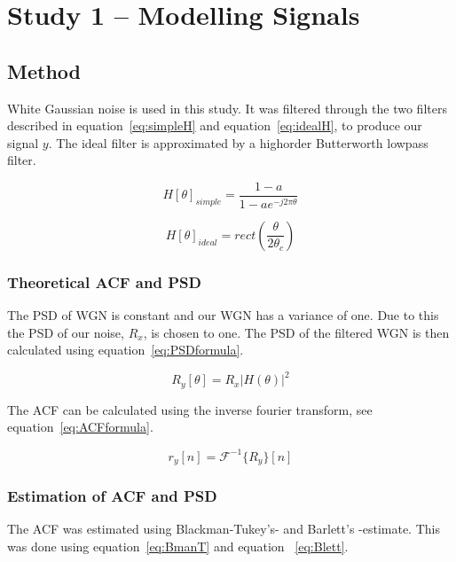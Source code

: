 \documentclass[10pt]{article}
\begin{document}
\section{Study 1 – Modelling Signals}
\subsection{Method}

White Gaussian noise is used in this study. It was filtered through the two
 filters described in equation~\ref{eq:simpleH} and equation~\ref{eq:idealH},
  to produce our signal $y$.
 The ideal filter is approximated by a highorder Butterworth lowpass filter.

\begin{equation}
  \label{eq:simpleH}
  H[\theta]_{simple} =\frac{1-a}{1-ae^{-j2\pi\theta }}
\end{equation}

\begin{equation}
  \label{eq:idealH}
  H[\theta]_{ideal} =rect(\frac{\theta}{2\theta_c} )
\end{equation}

\subsubsection{Theoretical ACF and PSD}
The PSD of WGN is constant and our WGN has a variance of one. Due to this the PSD
of our noise, $R_x$, is chosen to one.
The PSD of the filtered WGN is then calculated using equation~\ref{eq:PSDformula}.

\begin{equation}
  \label{eq:PSDformula}
  R_y[\theta] = R_x|H(\theta)|^2
\end{equation}

The ACF can be calculated using the inverse fourier transform, see equation~\ref{eq:ACFformula}.

\begin{equation}
  \label{eq:ACFformula}
  r_y[n] = \mathcal{F}^{-1}\{R_y\}[n]
\end{equation}



\subsubsection{Estimation of ACF and PSD}
The ACF was estimated using Blackman-Tukey's- and Barlett's -estimate.
This was done using equation~\ref{eq:BmanT} and equation ~\ref{eq:Blett}.
\end{document}
